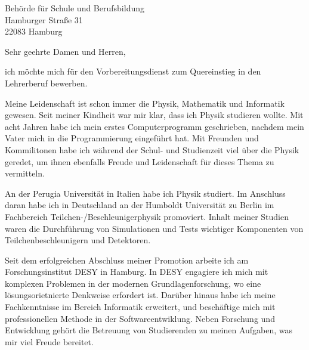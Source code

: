 \documentclass[ebner,paper=a4,fontsize=11pt,ngerman,BCOR=10mm]{scrlttr2}%
\begin{document}
\pagestyle{empty}

\begin{letter}{ Beh{\"o}rde f{\"u}r Schule und Berufsbildung\\
Hamburger Stra{\ss}e 31\\ 
22083 Hamburg}


\opening{Sehr geehrte Damen und Herren,} 

ich m{\"o}chte mich f{\"u}r den Vorbereitungsdienst zum Quereinstieg in den
Lehrerberuf bewerben.

Meine Leidenschaft ist schon immer die Physik,  Mathematik und  Informatik
gewesen. Seit meiner Kindheit war mir klar, dass ich Physik studieren wollte.
Mit acht Jahren habe ich mein erstes Computerprogramm geschrieben, nachdem mein
Vater mich in die Programmierung eingef{\"u}hrt hat. Mit Freunden und
Kommilitonen habe ich w{\"a}hrend der Schul- und Studienzeit viel {\"u}ber die
Physik geredet, um ihnen ebenfalls Freude und Leidenschaft f{\"u}r dieses Thema
zu vermitteln.


An der Perugia Universit{\"a}t in Italien habe ich Physik studiert. Im
Anschluss daran habe ich in Deutschland an der Humboldt Universit{\"a}t zu
Berlin im Fachbereich Teilchen-/Beschleunigerphysik promoviert. Inhalt meiner
Studien waren die Durchf{\"u}hrung von Simulationen und Tests wichtiger
Komponenten von Teilchenbeschleunigern und Detektoren.

Seit dem erfolgreichen Abschluss meiner Promotion arbeite ich am
Forschungsinstitut DESY in Hamburg. In DESY engagiere ich mich mit komplexen
Problemen in der modernen Grundlagenforschung, wo eine l{\"o}sungsorietnierte
Denkweise erfordert ist. Dar{\"u}ber hinaus habe ich meine Fachkenntnisse im
Bereich Informatik erweitert, und besch{\"a}ftige mich mit professionellen
Methode in der Softwareentwiklung. Neben Forschung und Entwicklung geh{\"o}rt
die Betreuung von Studierenden zu meinen Aufgaben, was mir viel Freude bereitet.




\end{letter}
\end{document}

